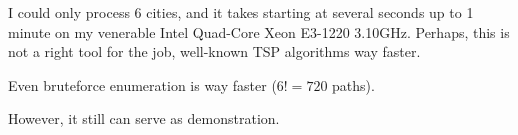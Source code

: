 I could only process 6 cities, and it takes starting at several seconds up to 1 minute on my venerable Intel Quad-Core Xeon E3-1220 3.10GHz.
Perhaps, this is not a right tool for the job, well-known TSP algorithms way faster.

Even bruteforce enumeration is way faster ($6!=720$ paths).

However, it still can serve as demonstration.

